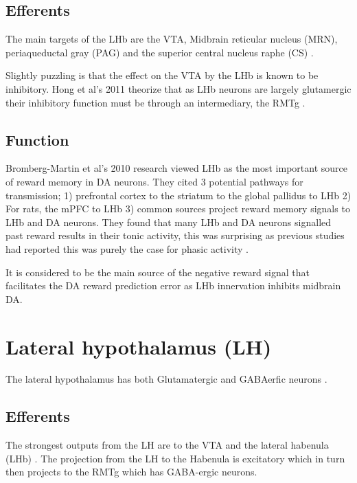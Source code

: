 \documentclass[12pt,a4paper]{article}
\let\oldsection\section
\renewcommand\section{\clearpage\oldsection}
\begin{document}
\subsection{Efferents}

The main targets of the LHb are the VTA, Midbrain reticular nucleus (MRN), periaqueductal gray (PAG) and the superior central nucleus raphe (CS) \citep{Quina2015}.

Slightly puzzling is that the effect on the VTA by the LHb is known to be inhibitory. Hong et al’s 2011 theorize that as LHb neurons are largely glutamergic their inhibitory function must be through an intermediary, the RMTg \citep{Hong2011}.

\subsection{Function}

Bromberg-Martin et al’s 2010 research viewed LHb as the most important source of reward memory in DA neurons. They cited 3 potential pathways for transmission; 1) prefrontal cortex to the striatum to the global pallidus to LHb 2) For rats, the mPFC to LHb 3) common sources project reward memory signals to LHb and DA neurons. They found that many LHb and DA neurons signalled past reward results in their tonic activity, this was surprising as previous studies had reported this was purely the case for phasic activity \citep{Bromberg-Martin2010}.

It is considered to be the main source of the negative reward signal that facilitates the DA reward prediction error as LHb innervation inhibits midbrain DA.\citep{Shen2012}\citep{Shabel2012}\citep{Matsumoto2007}\citep{Barrot2012} 





\section{Lateral hypothalamus (LH)}

The lateral hypothalamus has both Glutamatergic and GABAerfic neurons \citep{Stanley2011}.

\subsection{Efferents}

The strongest outputs from the LH are to the VTA and the lateral habenula (LHb) \citep{Stuber2016}. 
The projection from the LH to the Habenula is excitatory \citep{Poller2013} which in turn then projects to the RMTg which has GABA-ergic neurons.
\end{document}
